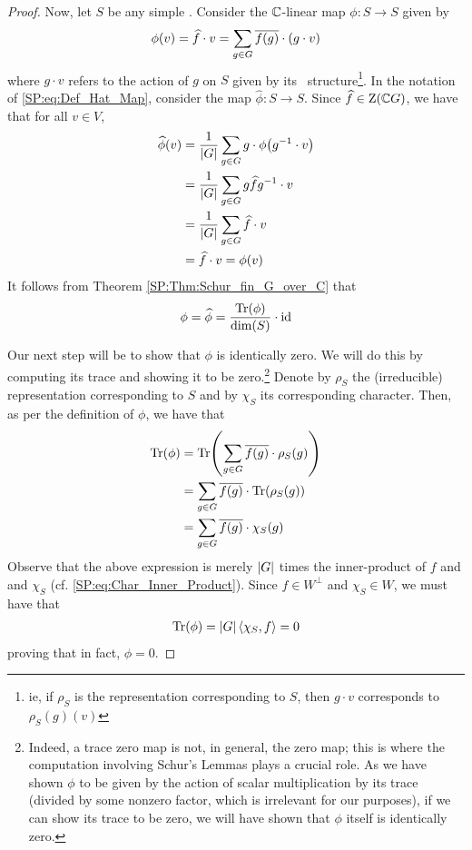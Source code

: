 \begin{proof}
    Now, let $S$ be any simple \CGM. Consider the $\mathbb{C}$-linear map $\phi : S \to S$ given by
    \begin{align*}
        \phi(v) = \widehat{f} \cdot v = \sum_{g \in G} \overline{f(g)} \cdot \left( g \cdot v \right)
    \end{align*}
    where $g \cdot v$ refers to the action of $g$ on $S$ given by its \CGM\ structure\footnote{ie, if $\rho_S$ is the representation corresponding to $S$, then $g \cdot v$ corresponds to $\rho_S(g)(v)$}. In the notation of \eqref{SP:eq:Def_Hat_Map}, consider the map $\hat{\phi} : S \to S$. Since $\widehat{f} \in \operatorname{Z}\!\left( \mathbb{C} G \right)$, we have that for all $v \in V$,
    \begin{align*}
        \widehat{\phi}(v) &= \frac{1}{\left\lvert G \right\rvert} \sum_{g \in G} g \cdot \phi\!\left( g^{-1} \cdot v \right) \\
        &= \frac{1}{\left\lvert G \right\rvert} \sum_{g \in G} g\widehat{f}g^{-1} \cdot v \\
        &= \frac{1}{\left\lvert G \right\rvert} \sum_{g \in G} \widehat{f} \cdot v \\
        &= \widehat{f} \cdot v = \phi(v)
    \end{align*}
    It follows from Theorem \ref{SP:Thm:Schur_fin_G_over_C} that
    \begin{align*}
        \phi = \widehat{\phi} = \frac{\operatorname{Tr}\!\left( \phi \right)}{\dim\!\left( S \right)} \cdot \operatorname{id}
    \end{align*}
    
    Our next step will be to show that $\phi$ is identically zero. We will do this by computing its trace and showing it to be zero.\footnote{Indeed, a trace zero map is not, in general, the zero map; this is where the computation involving Schur's Lemmas plays a crucial role. As we have shown $\phi$ to be given by the action of scalar multiplication by its trace (divided by some nonzero factor, which is irrelevant for our purposes), if we can show its trace to be zero, we will have shown that $\phi$ itself is identically zero.} Denote by $\rho_S$ the (irreducible) representation corresponding to $S$ and by $\chi_S$ its corresponding character. Then, as per the definition of $\phi$, we have that
    \begin{align*}
        \operatorname{Tr}\!\left( \phi \right) &=\operatorname{Tr}\!\left( \sum_{g \in G} \overline{f(g)} \cdot \rho_S(g) \right) \\
        &= \sum_{g \in G} \overline{f(g)} \cdot \operatorname{Tr}\!\left( \rho_S(g) \right) \\
        &= \sum_{g \in G} \overline{f(g)} \cdot \chi_S(g)
    \end{align*}
    Observe that the above expression is merely $\left\lvert G \right\rvert$ times the inner-product of $f$ and and $\chi_S$ (cf. \eqref{SP:eq:Char_Inner_Product}). Since $f \in W^{\perp}$ and $\chi_S \in W$, we must have that
    \begin{align*}
        \operatorname{Tr}\!\left( \phi \right) = \left\lvert G \right\rvert \left\langle {\chi_S}, {f} \right\rangle = 0
    \end{align*}
    proving that in fact, $\phi = 0$.
    

\end{proof}
